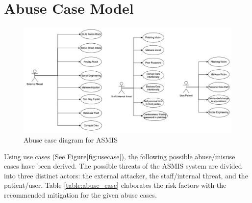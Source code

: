 \section{Abuse Case Model}

\begin{figure}[h!]
\centering
\includegraphics[width=\textwidth]{pics/abusecase.png}
\caption{Abuse case diagram for ASMIS}\label{fig:abuse_case}
\end{figure}

Using %
use cases (See Figure\ref{fig:usecase}), the following possible abuse/misuse cases have been derived.
The possible threats of the ASMIS system are divided into three distinct actors: the external attacker, the staff/internal threat, and the patient/user. Table \ref{table:abuse_case} elaborates the risk factors with the recommended mitigation for the given abuse cases.

